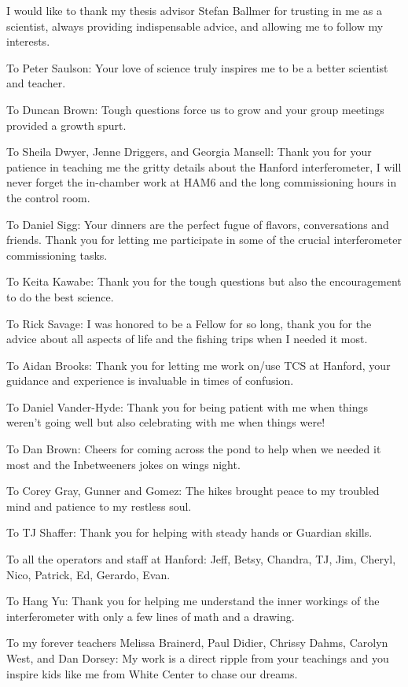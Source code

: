 	I would like to thank my thesis advisor Stefan Ballmer for trusting in me as a scientist, always providing indispensable advice, and allowing me to follow my interests.
	
	To Peter Saulson: Your love of science truly inspires me to be a better scientist and teacher.
	
	To Duncan Brown:  Tough questions force us to grow and your group meetings provided a growth spurt.
	
	To Sheila Dwyer, Jenne Driggers, and Georgia Mansell: Thank you for your patience in teaching me the gritty details about the Hanford interferometer, I will never forget the in-chamber work at HAM6 and the long commissioning hours in the control room.
	
	To Daniel Sigg: Your dinners are the perfect fugue of flavors, conversations and friends. Thank you for letting me participate in some of the crucial interferometer commissioning tasks.
	
	To Keita Kawabe: Thank you for the tough questions but also the encouragement to do the best science.
	
	To Rick Savage: I was honored to be a Fellow for so long, thank you for the advice about all aspects of life and the fishing trips when I needed it most.
	
	To Aidan Brooks: Thank you for letting me work on/use TCS at Hanford, your guidance and experience is invaluable in times of confusion.
	
	To Daniel Vander-Hyde: Thank you for being patient with me when things weren't going well but also celebrating with me when things were!
	
	To Dan Brown: Cheers for coming across the pond to help when we needed it most and the Inbetweeners jokes on wings night.
	
	To Corey Gray, Gunner and Gomez: The hikes brought peace to my troubled mind and patience to my restless soul.
	
	To TJ Shaffer: Thank you for helping with steady hands or Guardian skills.
	
	To all the operators and staff at Hanford: Jeff, Betsy, Chandra, TJ, Jim, Cheryl, Nico, Patrick, Ed, Gerardo, Evan.
	
	To Hang Yu: Thank you for helping me understand the inner workings of the interferometer with only a few lines of math and a drawing.
	
	To my forever teachers Melissa Brainerd, Paul Didier, Chrissy Dahms, Carolyn West, and Dan Dorsey:  My work is a direct ripple from your teachings and you inspire kids like me from White Center to chase our dreams.
	
